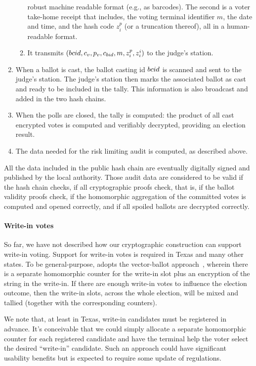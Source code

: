 \begin{enumerate}
\begin{enumerate}
    robust machine readable format (e.g., as barcodes). The second is
    a voter take-home receipt that includes, the voting terminal
    identifier $m$, the date and time, and the hash code $z^p_i$ (or a
    truncation thereof), all in a human-readable format.
  \item It transmits $({bcid}, c_v, p_v, c_{bid}, m, z^p_i, z^i_i)$ to
    the judge's station.
  \end{enumerate}
\item When a ballot is cast, the ballot casting id ${bcid}$ is scanned
  and sent to the judge's station.  The judge's station then marks the
  associated ballot as cast and ready to be included in the
  tally. This information is also broadcast and added in the two hash
  chains.
\item When the polls are closed, the tally is computed: the product of
  all cast encrypted votes is computed and verifiably decrypted,
  providing an election result.
\item The data needed for the risk limiting audit is computed, as described above. 
\end{enumerate}

All the data included in the public hash chain are eventually
digitally signed and published by the local authority. Those audit
data are considered to be valid if the hash chain checks, if all
cryptographic proofs check, that is, if the ballot validity proofs
check, if the homomorphic aggregation of the committed votes is
computed and opened correctly, and if all spoiled ballots are
decrypted correctly.

\paragraph{Write-in votes}
So far, we have not described how our cryptographic construction can
support write-in voting. Support for write-in votes is required in
Texas and many other states. To be general-purpose, \projname adopts
the vector-ballot approach~\cite{kiayias04vectorBallot}, wherein there
is a separate homomorphic counter for the write-in slot plus an
encryption of the string in the write-in. If there are enough write-in
votes to influence the election outcome, then the write-in slots,
across the whole election, will be mixed and tallied (together with
the corresponding counters).

We note that, at least in Texas, write-in candidates must be
registered in advance. It's conceivable that we could simply allocate
a separate homomorphic counter for each registered candidate and have
the \projname terminal help the voter select the desired ``write-in''
candidate. Such an approach could have significant usability benefits
but is expected to require some update of regulations.

